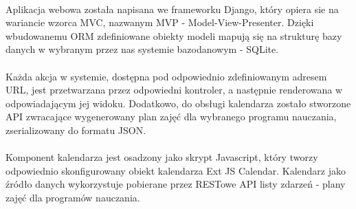 \paragraph{} Aplikacja webowa została napisana we frameworku Django, który opiera sie na wariancie wzorca MVC, nazwanym MVP - Model-View-Presenter. Dzięki wbudowanemu ORM zdefiniowane obiekty modeli mapują się na strukturę bazy danych w wybranym przez nas systemie bazodanowym - SQLite. 

\paragraph{}Każda akcja w systemie, dostępna pod odpowiednio zdefiniowanym adresem URL, jest przetwarzana przez odpowiedni kontroler, a następnie renderowana w odpowiadającym jej widoku. Dodatkowo, do obsługi kalendarza zostało stworzone API zwracające wygenerowany plan zajęć dla wybranego programu nauczania, zserializowany do formatu JSON.  
\paragraph{}Komponent kalendarza jest osadzony jako skrypt Javascript, który tworzy odpowiednio skonfigurowany obiekt kalendarza Ext JS Calendar. Kalendarz jako źródło danych wykorzystuje pobierane przez RESTowe API listy zdarzeń - plany zajęć dla programów nauczania.
